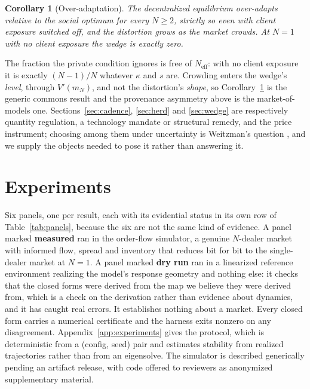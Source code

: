 \documentclass{article}
\theoremstyle{plain}
\newtheorem{corollary}[theorem]{Corollary}
\theoremstyle{definition}
\newcommand{\Neff}{N_{\mathrm{eff}}}
\newcommand{\mN}{m_N}
\begin{document}
\begin{corollary}[Over-adaptation]
\label{cor:over}
The decentralized equilibrium over-adapts relative to the social optimum for every $N \geq 2$, strictly so even with client exposure switched off, and the distortion grows as the market crowds. At $N=1$ with no client exposure the wedge is exactly zero.
\end{corollary}

The fraction the private condition ignores is free of $\Neff$: with no client exposure it is exactly $(N-1)/N$ whatever $\kappa$ and $s$ are. Crowding enters the wedge's \emph{level}, through $V'(\mN)$, and not the distortion's \emph{shape}, so Corollary~\ref{cor:over} is the generic commons result and the provenance asymmetry above is the market-of-models one. Sections~\ref{sec:cadence}, \ref{sec:herd} and \ref{sec:wedge} are respectively quantity regulation, a technology mandate or structural remedy, and the price instrument; choosing among them under uncertainty is Weitzman's question \citep{weitzman1974}, and we supply the objects needed to pose it rather than answering it.



\section{Experiments}
\label{sec:experiments}

Six panels, one per result, each with its evidential status in its own row of Table~\ref{tab:panels}, because the six are not the same kind of evidence. A panel marked \textbf{measured} ran in the order-flow simulator, a genuine $N$-dealer market with informed flow, spread and inventory that reduces bit for bit to the single-dealer market at $N=1$. A panel marked \textbf{dry run} ran in a linearized reference environment realizing the model's response geometry and nothing else: it checks that the closed forms were derived from the map we believe they were derived from, which is a check on the derivation rather than evidence about dynamics, and it has caught real errors. It establishes nothing about a market. Every closed form carries a numerical certificate and the harness exits nonzero on any disagreement. Appendix~\ref{app:experiments} gives the protocol, which is deterministic from a (config, seed) pair and estimates stability from realized trajectories rather than from an eigensolve. The simulator is described generically pending an artifact release, with code offered to reviewers as anonymized supplementary material.
\end{document}
